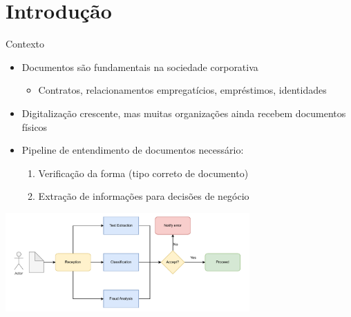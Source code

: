 \section{Introdução}

\begin{frame}{Contexto}
\begin{itemize}
    \item Documentos são fundamentais na sociedade corporativa
    \begin{itemize}
        \item Contratos, relacionamentos empregatícios, empréstimos, identidades
    \end{itemize}
    \item Digitalização crescente, mas muitas organizações ainda recebem documentos físicos
    \item Pipeline de entendimento de documentos necessário:
    \begin{enumerate}
        \item Verificação da forma (tipo correto de documento)
        \item Extração de informações para decisões de negócio
    \end{enumerate}
\end{itemize}
\begin{center}
\includegraphics[width=0.7\textwidth]{images/diagrama-compliance.drawio.pdf}
\end{center}
\end{frame}

